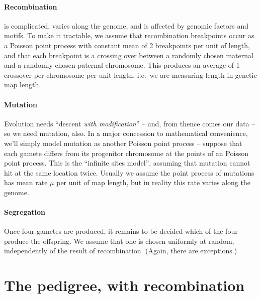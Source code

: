 \paragraph{Recombination} is complicated, varies along the genome, and is affected by genomic factors and motifs.
To make it tractable, we assume that recombination breakpoints occur as a Poisson point process 
with constant mean of 2 breakpoints per unit of length,
and that each breakpoint is a crossing over between a randomly chosen maternal and a randomly chosen paternal chromosome.
This produces an average of 1 crossover per chromosome per unit length, 
i.e.\ we are measuring length in genetic map length.


\paragraph{Mutation}
Evolution needs ``descent \emph{with modification}'' -- and, from thence comes our data -- so we need mutation, also.
In a major concession to mathematical convenience, we'll simply model mutation as another Poisson point process --
suppose that each gamete differs from its progenitor chromosome at the points of an Poisson point process.
This is the ``infinite sites model'', assuming that mutation cannot hit at the same location twice.
Usually we assume the point process of mutations has mean rate $\mu$ per unit of map length,
but in reality this rate varies along the genome.

\paragraph{Segregation}
Once four gametes are produced, it remains to be decided which of the four produce the offspring.
We assume that one is chosen uniformly at random,
independently of the result of recombination.
(Again, there are exceptions.)


\section{The pedigree, with recombination}

